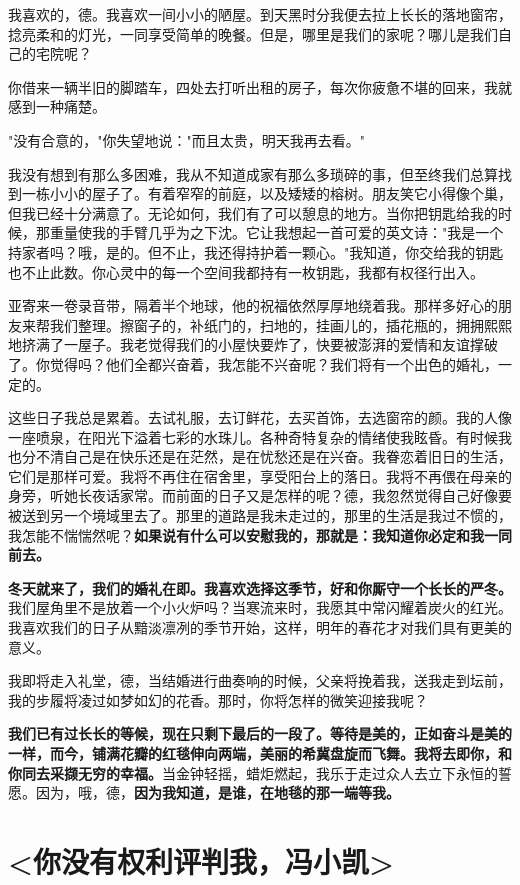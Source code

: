 \documentclass[UTF8,a4paper,8pt]{ctexart}
\begin{document}
 我喜欢的，德。我喜欢一间小小的陋屋。到天黑时分我便去拉上长长的落地窗帘，捻亮柔和的灯光，一同享受简单的晚餐。但是，哪里是我们的家呢？哪儿是我们自己的宅院呢？
 
 你借来一辆半旧的脚踏车，四处去打听出租的房子，每次你疲惫不堪的回来，我就感到一种痛楚。
 
 "没有合意的，"你失望地说："而且太贵，明天我再去看。"
 
 我没有想到有那么多困难，我从不知道成家有那么多琐碎的事，但至终我们总算找到一栋小小的屋子了。有着窄窄的前庭，以及矮矮的榕树。朋友笑它小得像个巢，但我已经十分满意了。无论如何，我们有了可以憩息的地方。当你把钥匙给我的时候，那重量使我的手臂几乎为之下沈。它让我想起一首可爱的英文诗："我是一个持家者吗？哦，是的。但不止，我还得持护着一颗心。"我知道，你交给我的钥匙也不止此数。你心灵中的每一个空间我都持有一枚钥匙，我都有权径行出入。
 
 亚寄来一卷录音带，隔着半个地球，他的祝福依然厚厚地绕着我。那样多好心的朋友来帮我们整理。擦窗子的，补纸门的，扫地的，挂画儿的，插花瓶的，拥拥熙熙地挤满了一屋子。我老觉得我们的小屋快要炸了，快要被澎湃的爱情和友谊撑破了。你觉得吗？他们全都兴奋着，我怎能不兴奋呢？我们将有一个出色的婚礼，一定的。
 
 这些日子我总是累着。去试礼服，去订鲜花，去买首饰，去选窗帘的颜。我的人像一座喷泉，在阳光下溢着七彩的水珠儿。各种奇特复杂的情绪使我眩昏。有时候我也分不清自己是在快乐还是在茫然，是在忧愁还是在兴奋。我眷恋着旧日的生活，它们是那样可爱。我将不再住在宿舍里，享受阳台上的落日。我将不再偎在母亲的身旁，听她长夜话家常。而前面的日子又是怎样的呢？德，我忽然觉得自己好像要被送到另一个境域里去了。那里的道路是我未走过的，那里的生活是我过不惯的，我怎能不惴惴然呢？\textbf{如果说有什么可以安慰我的，那就是：我知道你必定和我一同前去。}
 
 \textbf{冬天就来了，我们的婚礼在即。我喜欢选择这季节，好和你厮守一个长长的严冬。}我们屋角里不是放着一个小火炉吗？当寒流来时，我愿其中常闪耀着炭火的红光。我喜欢我们的日子从黯淡凛冽的季节开始，这样，明年的春花才对我们具有更美的意义。
 
 我即将走入礼堂，德，当结婚进行曲奏响的时候，父亲将挽着我，送我走到坛前，我的步履将凌过如梦如幻的花香。那时，你将怎样的微笑迎接我呢？
 
 \textbf{我们已有过长长的等候，现在只剩下最后的一段了。等待是美的，正如奋斗是美的一样，而今，铺满花瓣的红毯伸向两端，美丽的希冀盘旋而飞舞。我将去即你，和你同去采撷无穷的幸福。}当金钟轻摇，蜡炬燃起，我乐于走过众人去立下永恒的誓愿。因为，哦，德，\textbf{因为我知道，是谁，在地毯的那一端等我。}
 
 \newpage
 \section{<你没有权利评判我，冯小凯>}
 
\end{document}
